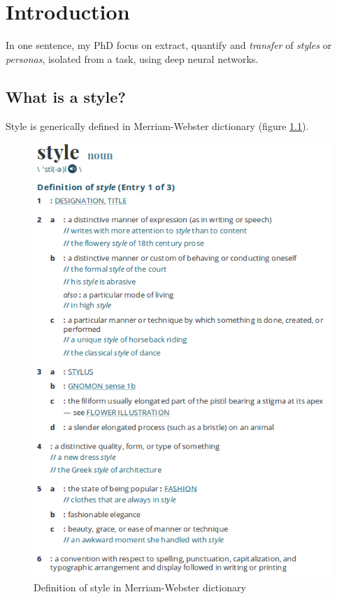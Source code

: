 \chapter{Introduction}
\minitoc%

\par In one sentence, my PhD focus on extract, quantify and \textit{transfer} of \textit{styles} or \textit{personas}, isolated from a task, using deep neural networks.

\section{What is a style?}\label{sec:style}
  \par Style is generically defined in Merriam-Webster dictionary (figure \ref{fig:style_def_webster}).

  \begin{figure}[!htbp]
    \includegraphics[scale=0.6]{./images/introduction/style_def_webster.png}
    \caption{Definition of style in Merriam-Webster dictionary}
    \label{fig:style_def_webster}
  \end{figure}

